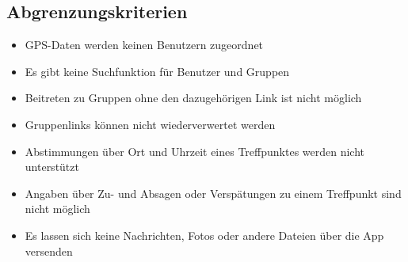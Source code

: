 \subsection{Abgrenzungskriterien}
\begin{itemize}
	\item GPS-Daten werden keinen Benutzern zugeordnet
	\item Es gibt keine Suchfunktion für Benutzer und Gruppen
	\item Beitreten zu Gruppen ohne den dazugehörigen Link ist nicht möglich
	\item Gruppenlinks können nicht wiederverwertet werden
	\item Abstimmungen über Ort und Uhrzeit eines Treffpunktes werden nicht unterstützt
	\item Angaben über Zu- und Absagen oder Verspätungen zu einem Treffpunkt sind nicht möglich
	\item Es lassen sich keine Nachrichten, Fotos oder andere Dateien über die App versenden
\end{itemize}
